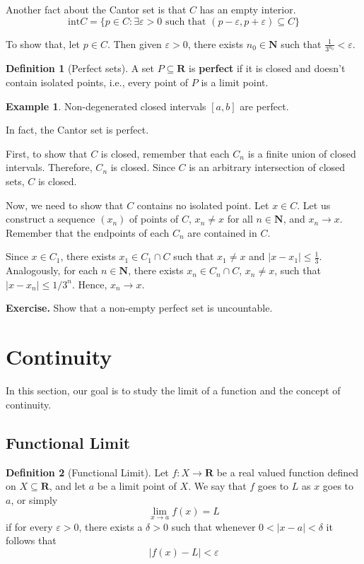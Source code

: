 \documentclass[12pt,a4paper]{article}
\theoremstyle{definition}
\newtheorem{example}{Example}[section]
\newtheorem{definition}{Definition}[section]
\begin{document}
Another fact about the Cantor set is that $C$ has an empty interior.
\[
	\text{int} C = \{ p \in C : \exists \varepsilon > 0 \text{ such that } (p-\varepsilon, p+\varepsilon) \subseteq C \}
\]

To show that, let $p \in C$. Then given $\varepsilon > 0$, there exists $n_0 \in \textbf{N}$ such that $\frac{1}{3^{n_0}} < \varepsilon$. 

\begin{definition}[Perfect sets]
	A set $P \subseteq \textbf{R}$ is \textbf{perfect} if it is closed and doesn't contain isolated points, i.e., every point of $P$ is a limit point.
\end{definition}

\begin{example}
	Non-degenerated closed intervals $[a,b]$ are perfect.
\end{example}

In fact, the Cantor set is perfect. 

First, to show that $C$ is closed, remember that each $C_n$ is a finite union of closed intervals. Therefore, $C_n$ is closed. Since $C$ is an arbitrary intersection of closed sets, $C$ is closed.

Now, we need to show that $C$ contains no isolated point. Let $x \in C$. Let us construct a sequence $(x_n)$ of points of $C$, $x_n \neq x$ for all $n \in \textbf{N}$, and $x_n \to x$. Remember that the endpoints of each $C_n$ are contained in $C$.

Since $x \in C_1$, there exists $x_1 \in C_1 \cap C$ such that $x_1 \neq x$ and $|x - x_1| \leq \frac{1}{3}$. Analogously, for each $n \in \textbf{N}$, there exists $x_n \in C_n \cap C$, $x_n \neq x$, such that $|x - x_n| \leq 1/3^n$. Hence, $x_n \to x$.

\textbf{Exercise.} Show that a non-empty perfect set is uncountable.

\newpage

\section{Continuity}

In this section, our goal is to study the limit of a function and the concept of continuity.

\subsection{Functional Limit}

\begin{definition}[Functional Limit]
	Let $f : X \longrightarrow \textbf{R}$ be a real valued function defined on $X \subseteq \textbf{R}$, and let $a$ be a limit point of $X$. We say that $f$ goes to $L$ as $x$ goes to $a$, or simply
	\[
		\lim_{x \to a} f(x) = L
	\]
	if for every $\varepsilon > 0$, there exists a $\delta > 0$ such that whenever $0 < |x - a| < \delta$ it follows that
	\[
		|f(x) - L| < \varepsilon
	\]
\end{definition}
\end{document}
